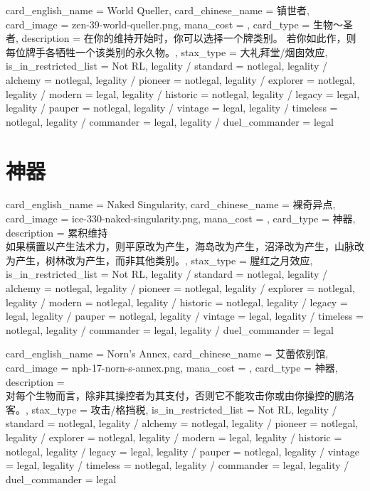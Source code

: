 \documentclass[lang = cn, color = black, 10pt]{AllThatStax}
\begin{document}
\card
{
	card_english_name = {World Queller},
	card_chinese_name = {镇世者},
	card_image = zen-39-world-queller.png,
	mana_cost = ,
	card_type = 生物～圣者,
	description = {在你的维持开始时，你可以选择一个牌类别。 若你如此作，则每位牌手各牺牲一个该类别的永久物。},
	stax_type = 大礼拜堂/烟囱效应,
	is_in_restricted_list = Not RL,
	legality / standard = notlegal,
	legality / alchemy = notlegal,
	legality / pioneer = notlegal,
	legality / explorer = notlegal,
	legality / modern = legal,
	legality / historic = notlegal,
	legality / legacy = legal,
	legality / pauper = notlegal,
	legality / vintage = legal,
	legality / timeless = notlegal,
	legality / commander = legal,
	legality / duel_commander = legal
}

\section{神器}

\card
{
	card_english_name = {Naked Singularity},
	card_chinese_name = {裸奇异点},
	card_image = ice-330-naked-singularity.png,
	mana_cost = ,
	card_type = 神器,
	description = {累积维持\\
如果横置以产生法术力，则平原改为产生，海岛改为产生，沼泽改为产生，山脉改为产生，树林改为产生，而非其他类别。},
	stax_type = 腥红之月效应,
	is_in_restricted_list = Not RL,
	legality / standard = notlegal,
	legality / alchemy = notlegal,
	legality / pioneer = notlegal,
	legality / explorer = notlegal,
	legality / modern = notlegal,
	legality / historic = notlegal,
	legality / legacy = legal,
	legality / pauper = notlegal,
	legality / vintage = legal,
	legality / timeless = notlegal,
	legality / commander = legal,
	legality / duel_commander = legal
}

\card
{
	card_english_name = {Norn's Annex},
	card_chinese_name = {艾蕾侬别馆},
	card_image = nph-17-norn-s-annex.png,
	mana_cost = ,
	card_type = 神器,
	description = {\\
对每个生物而言，除非其操控者为其支付，否则它不能攻击你或由你操控的鹏洛客。},
	stax_type = 攻击/格挡税,
	is_in_restricted_list = Not RL,
	legality / standard = notlegal,
	legality / alchemy = notlegal,
	legality / pioneer = notlegal,
	legality / explorer = notlegal,
	legality / modern = legal,
	legality / historic = notlegal,
	legality / legacy = legal,
	legality / pauper = notlegal,
	legality / vintage = legal,
	legality / timeless = notlegal,
	legality / commander = legal,
	legality / duel_commander = legal
}
\end{document}
